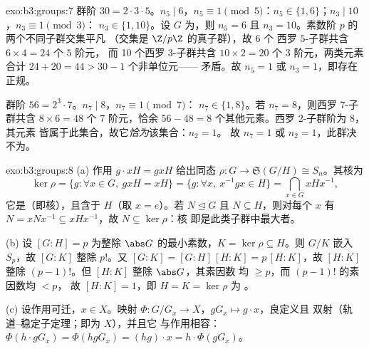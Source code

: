 \begin{solution}{exo:b3:groups:7}
群阶 $30 = 2 \cdot 3 \cdot 5$。$n_5 \mid 6$，$n_5 \equiv 1 \pmod
5$：$n_5 \in \{1, 6\}$；$n_3 \mid 10$，$n_3 \equiv 1 \pmod 3$：
$n_3 \in \{1, 10\}$。设 $G$ 为，则 $n_5 = 6$ 且 $n_3 =
10$。素数阶 $p$ 的两个不同子群交集平凡
（交集是 $\Z/p\Z$ 的真子群），故 6 个
西罗 $5$-子群共含 $6 \times 4 = 24$ 个 $5$ 阶元，
而 10 个西罗 $3$-子群共含 $10 \times 2 = 20$ 个
$3$ 阶元，两类元素合计 $24 + 20 = 44 > 30 - 1$ 个非单位元——
矛盾。故 $n_5 = 1$ 或 $n_3 = 1$，即存在正规。

群阶 $56 = 2^3 \cdot 7$。$n_7 \mid 8$，$n_7 \equiv 1 \pmod 7$：
$n_7 \in \{1, 8\}$。若 $n_7 = 8$，则西罗 $7$-子群共含 $8
\times 6 = 48$ 个 $7$ 阶元，恰余 $56 - 48 =
8$ 个其他元素。西罗 $2$-子群阶为 $8$，其元素
皆属于此集合，故它\emph{恰为}该集合：$n_2 = 1$。
故 $n_7 = 1$ 或 $n_2 = 1$，此群决不为。
\end{solution}

\begin{solution}{exo:b3:groups:8}
(a) 作用 $g \cdot xH = gxH$ 给出同态 $\rho \colon G
\to \mathfrak S(G/H) \cong S_n$。其核为
\[
\ker\rho = \{g : \forall x \in G,\ gxH = xH\}
= \{g : \forall x,\ x^{-1}gx \in H\}
= \bigcap_{x \in G} xHx^{-1},
\]
它是（即核），且含于 $H$（取 $x = e$）。若
$N \trianglelefteq G$ 且 $N \subseteq H$，则对每个 $x$ 有 $N
= xNx^{-1} \subseteq xHx^{-1}$，故 $N \subseteq \ker\rho$：核
即是此类子群中最大者。

(b) 设 $[G:H] = p$ 为整除 $\abs G$ 的最小素数，$K =
\ker\rho \subseteq H$。则 $G/K$ 嵌入 $S_p$，故 $[G:K]$
整除 $p!$。又 $[G:K] = [G:H]\,[H:K] = p\,[H:K]$，故 $[H:K]$
整除 $(p-1)!$。但 $[H:K]$ 整除 $\abs G$，其素因数
均 $\geq p$，而 $(p-1)!$ 的素因数均 $< p$，
故 $[H:K] = 1$，即 $H = K = \ker \rho$ 为
。

(c) 设作用可迁，$x \in X$。映射 $\Phi
\colon G/G_x \to X$，$gG_x \mapsto g \cdot x$，良定义且
双射（轨道--稳定子定理；即为 $X$），并且它
与作用相容：$\Phi(h \cdot gG_x) = \Phi(hgG_x) = (hg)
\cdot x = h \cdot \Phi(gG_x)$。
\end{solution}


